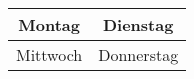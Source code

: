 
\begin{tabular}{|c|c|}
	\hline
	Montag & Dienstag \\
	\hline
	Mittwoch & Donnerstag \\
	\hline
\end{tabular}